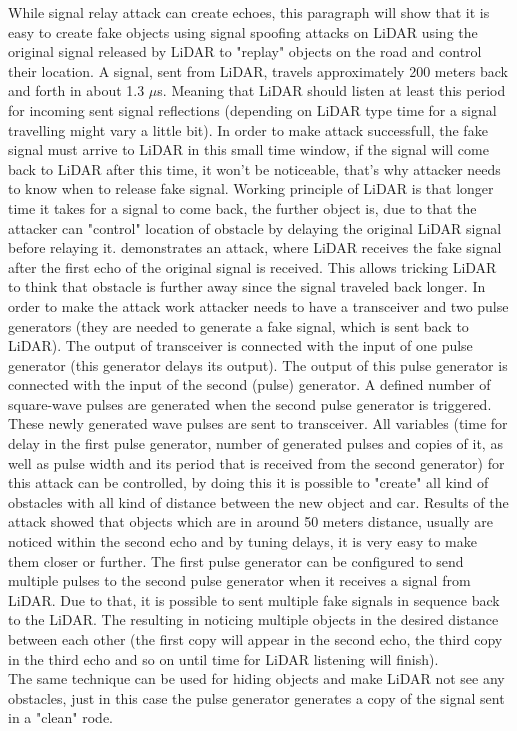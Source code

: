While signal relay attack can create echoes, this paragraph will show that it is easy to create fake objects using signal spoofing attacks on \gls{LiDAR} using the original signal released by \gls{LiDAR} to "replay" objects on the road and control their location.
A signal, sent from \gls{LiDAR}, travels approximately 200 meters back and forth in about 1.3 $\mu$s. Meaning that \gls{LiDAR} should listen at least this period for incoming sent signal reflections (depending on \gls{LiDAR} type time for a signal travelling might vary a little bit). In order to make attack successfull, the fake signal must arrive to \gls{LiDAR} in this small time window, if the signal will come back to \gls{LiDAR} after this time, it won't be noticeable, that's why attacker needs to know when to release fake signal. Working principle of \gls{LiDAR} is that longer time it takes for a signal to come back, the further object is, due to that the attacker can "control" location of obstacle by delaying the original \gls{LiDAR} signal before relaying it. \cite{AttacksOnSensors} demonstrates an attack, where \gls{LiDAR} receives the fake signal after the first echo of the original signal is received. This allows tricking \gls{LiDAR} to think that obstacle is further away since the signal traveled back longer. In order to make the attack work attacker needs to have a transceiver and two pulse generators (they are needed to generate a fake signal, which is sent back to \gls{LiDAR}). The output of transceiver is connected with the input of one pulse generator (this generator delays its output). The output of this pulse generator is connected with the input of the second (pulse) generator. A defined number of square-wave pulses are generated when the second pulse generator is triggered. These newly generated wave pulses are sent to transceiver.  All variables (time for delay in the first pulse generator, number of generated pulses and copies of it, as well as pulse width and its period that is received from the second generator) for this attack can be controlled, by doing this it is possible to "create" all kind of obstacles with all kind of distance between the new object and car. Results of the attack showed that objects which are in around 50 meters distance, usually are noticed within the second echo and by tuning delays, it is very easy to make them closer or further. The first pulse generator can be configured to send multiple pulses to the second pulse generator when it receives a signal from \gls{LiDAR}. Due to that, it is possible to sent multiple fake signals in sequence back to the \gls{LiDAR}. The resulting in noticing multiple objects in the desired distance between each other (the first copy will appear in the second echo, the third copy in the third echo and so on until time for \gls{LiDAR} listening will finish).\\
The same technique can be used for hiding objects and make \gls{LiDAR} not see any obstacles, just in this case the pulse generator generates a copy of the signal sent in a "clean" rode.

